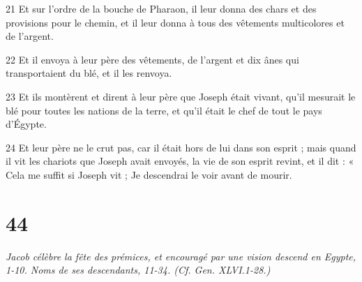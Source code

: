 \par 21 Et sur l'ordre de la bouche de Pharaon, il leur donna des chars et des provisions pour le chemin, et il leur donna à tous des vêtements multicolores et de l'argent.
\par 22 Et il envoya à leur père des vêtements, de l'argent et dix ânes qui transportaient du blé, et il les renvoya.
\par 23 Et ils montèrent et dirent à leur père que Joseph était vivant, qu'il mesurait le blé pour toutes les nations de la terre, et qu'il était le chef de tout le pays d'Égypte.
\par 24 Et leur père ne le crut pas, car il était hors de lui dans son esprit ; mais quand il vit les chariots que Joseph avait envoyés, la vie de son esprit revint, et il dit : « Cela me suffit si Joseph vit ; Je descendrai le voir avant de mourir.

\chapter{44}

\par \textit{Jacob célèbre la fête des prémices, et encouragé par une vision descend en Egypte, 1-10. Noms de ses descendants, 11-34. (Cf. Gen. XLVI.1-28.)}

